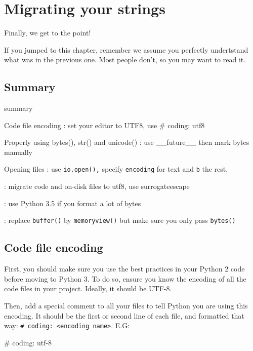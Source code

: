 
\chapter{Migrating your strings}

Finally, we get to the point!

If you jumped to this chapter, remember we assume you perfectly undertstand what was in the previous one. Most people don't, so you may want to read it.

\section{Summary}

\begin{labeling}{summary}
    \item [Code file encoding]: set your editor to UTF8, use \# coding: utf8
    \item [Properly using bytes(), str() and unicode()]: use \_\_future\_\_ then mark bytes manually
    \item [Opening files]: use \lstinline{io.open(),} specify \lstinline{encoding} for text and \lstinline{b} the rest.
    \item [Fun with file paths]: migrate code and on-disk files to utf8, use surrogateescape
    \item [Formatting]: use Python 3.5 if you format a lot of bytes
    \item [from buffer() to memoryview()]: replace \lstinline{buffer()} by \lstinline{memoryview()} but make sure you only pass \lstinline{bytes()}
\end{labeling}

\section{Code file encoding}

First, you should make sure you use the best practices in your Python 2 code before moving to Python 3. To do so, ensure you know the encoding of all the code files in your project. Ideally, it should be UTF-8.

Then, add a special comment to all your files to tell Python you are using this encoding. It should be the first or second line of each file, and formatted that way: \lstinline{# coding: <encoding name>}. E.G:

\begin{py2and3}
# coding: utf-8
\end{py2and3}

